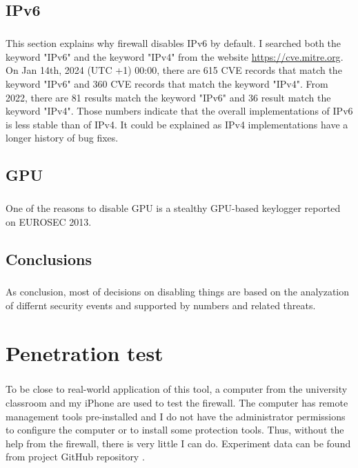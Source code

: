 \documentclass[mscthesis]{usiinfthesis}
\begin{document}
\section{IPv6}
\paragraph{}
This section explains why firewall disables IPv6 by default. I searched both the keyword "IPv6" and the keyword "IPv4" from the website \url{https://cve.mitre.org}. On Jan 14th, 2024 (UTC +1) 00:00, there are 615 CVE records that match the keyword "IPv6" and 360 CVE records that match the keyword "IPv4". From 2022, there are 81 results match the keyword "IPv6" and 36 result match the keyword "IPv4". Those numbers indicate that the overall implementations of IPv6 is less stable than of IPv4. It could be explained as IPv4 implementations have a longer history of bug fixes.

\section{GPU}
\paragraph{}
One of the reasons to disable GPU is a stealthy GPU-based keylogger reported on EUROSEC 2013. \citep{gpu:keylogger}

\section{Conclusions}
\paragraph{}
As conclusion, most of decisions on disabling things are based on the analyzation of differnt security events and supported by numbers and related threats.

\chapter{Penetration test}
\paragraph{}
To be close to real-world application of this tool, a computer from the university classroom and my iPhone are used to test the firewall. The computer has remote management tools pre-installed and I do not have the administrator permissions to configure the computer or to install some protection tools. Thus, without the help from the firewall, there is very little I can do. Experiment data can be found from project GitHub repository \citep{hood:github}.
\end{document}
